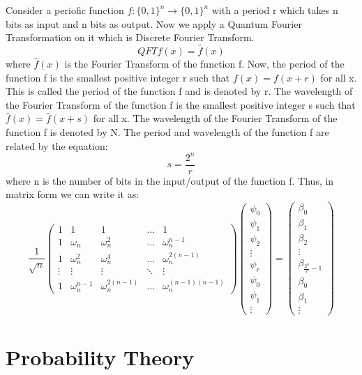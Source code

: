 \documentclass[12pt, oneside]{book}
\theoremstyle{definition}
\theoremstyle{definition}
\theoremstyle{remark}
\begin{document}
\begin{itemize}
    Consider a periofic function $f:\{0,1\}^n \rightarrow \{0,1\}^n$ with a period r which takes n bits as input and n bits as output. Now we apply a Quantum Fourier Transformation on it
    which is Discrete Fourier Transform.
    \[ 
    QFT f(x) = \hat{f}(x)
    \]
    where $\hat{f}(x)$ is the Fourier Transform of the function f. 
    Now, the period of the function f is the smallest positive integer r 
    such that $f(x)=f(x+r)$ for all x. This is called the period of the function f and is denoted by r. 
    The wavelength of the Fourier Transform of the 
    function f is the smallest positive integer s such that $\hat{f}(x)=\hat{f}(x+s)$ 
    for all x. The wavelength of the Fourier Transform of the function f is denoted by 
    N. The period and wavelength of the function f are related by the equation:
    \[ s=\dfrac{2^n}{r} \]
    where n is the number of bits in the input/output of the function f. 
    Thus, in matrix form we can write it as:
    \[ \dfrac{1}{\sqrt{n}}\begin{pmatrix} 1 & 1 & 1 & \ldots & 1 \\ 1 & \omega_n & \omega_n^2 & \ldots & \omega_n^{n-1} \\ 1 & \omega_n^2 & \omega_n^4 & \ldots & \omega_n^{2(n-1)} \\ \vdots & \vdots & \vdots & \ddots & \vdots \\ 1 & \omega_n^{n-1} & \omega_n^{2(n-1)} & \ldots & \omega_n^{(n-1)(n-1)} \end{pmatrix}\begin{pmatrix} \psi_0 \\ \psi_1 \\ \psi_2 \\ \vdots \\ \psi_r \\ \psi_0 \\ \psi_1 \\ \vdots \end{pmatrix}=\begin{pmatrix} \beta_0 \\ \beta_1 \\ \beta_2 \\ \vdots \\ \beta_{\frac{2^n}{r}-1} \\ \beta_0 \\ \beta_1 \\ \vdots \end{pmatrix} \]
\end{itemize}

\section{Probability Theory}
\end{document}
